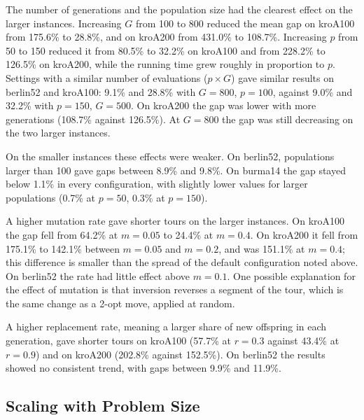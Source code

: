 \documentclass[11pt,a4paper]{article}
\begin{document}
The number of generations and the population size had the clearest effect on
the larger instances. Increasing $G$ from 100 to 800 reduced the mean gap on
kroA100 from 175.6\% to 28.8\%, and on kroA200 from 431.0\% to 108.7\%.
Increasing $p$ from 50 to 150 reduced it from 80.5\% to 32.2\% on kroA100 and
from 228.2\% to 126.5\% on kroA200, while the running time grew roughly in
proportion to $p$. Settings with a similar number of evaluations ($p \times G$)
gave similar results on berlin52 and kroA100: 9.1\% and 28.8\% with $G=800$,
$p=100$, against 9.0\% and 32.2\% with $p=150$, $G=500$. On kroA200 the gap was
lower with more generations (108.7\% against 126.5\%). At $G=800$ the gap was
still decreasing on the two larger instances.

On the smaller instances these effects were weaker. On berlin52, populations
larger than 100 gave gaps between 8.9\% and 9.8\%. On burma14 the gap stayed
below 1.1\% in every configuration, with slightly lower values for larger
populations (0.7\% at $p=50$, 0.3\% at $p=150$).

A higher mutation rate gave shorter tours on the larger instances. On kroA100
the gap fell from 64.2\% at $m=0.05$ to 24.4\% at $m=0.4$. On kroA200 it fell
from 175.1\% to 142.1\% between $m=0.05$ and $m=0.2$, and was 151.1\% at
$m=0.4$; this difference is smaller than the spread of the default
configuration noted above. On berlin52 the rate had little effect above
$m=0.1$. One possible explanation for the effect of mutation is that
inversion reverses a segment of the tour, which is the same change as a 2-opt
move, applied at random.

A higher replacement rate, meaning a larger share of new offspring in each
generation, gave shorter tours on kroA100 (57.7\% at $r=0.3$ against 43.4\% at
$r=0.9$) and on kroA200 (202.8\% against 152.5\%). On berlin52 the results
showed no consistent trend, with gaps between 9.9\% and 11.9\%.

\subsection{Scaling with Problem Size}
\end{document}
